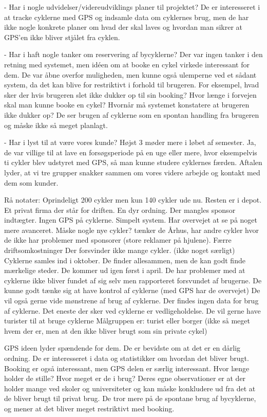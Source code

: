 - Har i nogle udvidelser/videreudviklings planer til projektet?
De er interesseret i at tracke cyklerne med GPS og indsamle data om cyklernes brug, men de har ikke nogle konkrete planer om hvad
der skal laves og hvordan man sikrer at GPS'en ikke bliver stjålet fra cyklen.

- Har i haft nogle tanker om reservering af bycyklerne?
Der var ingen tanker i den retning med systemet, men idéen om at booke en cykel virkede interessant for dem. De var åbne overfor
muligheden, men kunne også ulemperne ved et sådant system, da det kan blive for restriktivt i forhold til brugeren.
For eksempel, hvad sker der hvis brugeren slet ikke dukker op til sin booking? Hvor længe i forvejen skal man kunne booke en cykel?
Hvornår må systemet konstatere at brugeren ikke dukker op?
De ser brugen af cyklerne som en spontan handling fra brugeren og måske ikke så meget planlagt.
 
- Har i lyst til at være vores kunde? Højst 3 møder mere i løbet af semester.
Ja, de var villige til at lave en forsøgsperiode på en uge eller mere, hvor eksempelvis ti cykler blev udstyret med GPS, så man kunne
studere cyklernes færden.
Aftalen lyder, at vi tre grupper snakker sammen om vores videre arbejde og kontakt med dem som kunder.

Rå notater:
Oprindeligt 200 cykler men kun 140 cykler ude nu.
Resten er i depot.
Et privat firma der står for driften. En dyr ordning. Der mangles sponsor indtægter.
Ingen GPS på cyklerne. Simpelt system.
Har overvejet at se på noget mere avanceret. Måske nogle nye cykler? tænker de
Århus, har andre cykler hvor de ikke har problemer med sponsorer (store reklamer på hjulene). Færre driftsomkostninger
Der forsvinder ikke mange cykler. (ikke noget særligt)
Cyklerne samles ind i oktober. De finder allesammen, men de kan godt finde mærkelige steder. De kommer ud igen først i april.
De har problemer med at cyklerne ikke bliver fundet af sig selv men rapporteret forsvundet af brugerne.
De kunne godt tænke sig at have kontrol af cyklerne (med GPS har de overvejet)
De vil også gerne vide mønstrene af brug af cyklerne.
Der findes ingen data for brug af cyklerne. Det eneste der sker ved cyklerne er vedligeholdelse.
De vil gerne have turister til at bruge cyklerne
Målgruppen er: turist eller borger (ikke så meget hvem der er, men at den ikke bliver brugt som sin private cykel)

GPS ideen lyder spændende for dem.
De er bevidste om at det er en dårlig ordning.
De er interesseret i data og statistikker om hvordan det bliver brugt.
Booking er også interessant, men GPS delen er særlig interessant.
Hvor længe holder de stille? Hvor meget er de i brug?
Deres egne observationer er at der holder mange ved skoler og universiteter og kan måske konkludere ud fra det at de
bliver brugt til privat brug.
De tror mere på de spontane brug af bycyklerne, og mener at det bliver meget restriktivt med booking.